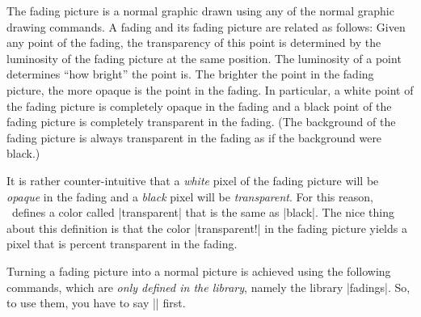 The fading picture is a normal graphic drawn using any of the normal graphic
drawing commands. A fading and its fading picture are related as follows: Given
any point of the fading, the transparency of this point is determined by the
luminosity of the fading picture at the same position. The luminosity of a
point determines ``how bright'' the point is. The brighter the point in the
fading picture, the more opaque is the point in the fading. In particular, a
white point of the fading picture is completely opaque in the fading and a
black point of the fading picture is completely transparent in the fading. (The
background of the fading picture is always transparent in the fading as if the
background were black.)

It is rather counter-intuitive that a \emph{white} pixel of the fading picture
will be \emph{opaque} in the fading and a \emph{black} pixel will be
\emph{transparent}. For this reason, \tikzname\ defines a color called
|transparent| that is the same as |black|. The nice thing about this definition
is that the color |transparent!| in the fading picture yields
a pixel that is  percent transparent in the fading.

Turning a fading picture into a normal picture is achieved using the following
commands, which are \emph{only defined in the library}, namely the library
|fadings|. So, to use them, you have to say |\usetikzlibrary{fadings}| first.

